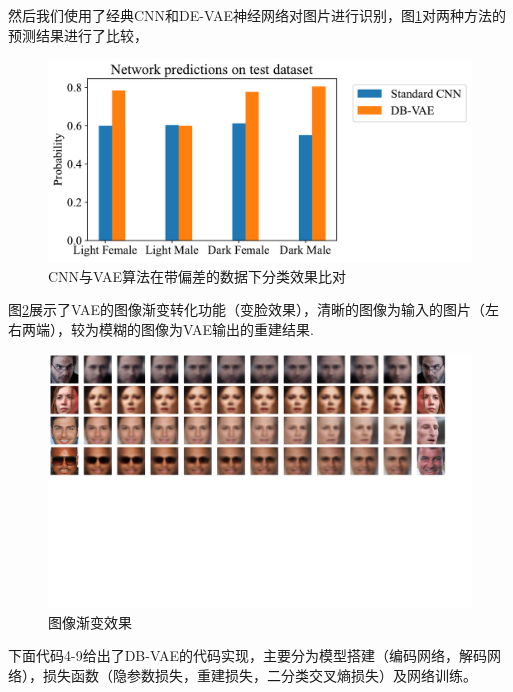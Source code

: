 \documentclass[12pt, a4paper, oneside]{ctexart}
\begin{document}
然后我们使用了经典CNN和DE-VAE神经网络对图片进行识别，图\ref{fig-compare-cnn-vae}对两种方法的预测结果进行了比较，

\begin{figure}[h]
  \centering
  \includegraphics[scale=0.7]{./code/figures/DB-VAE/compare_cnn_vae.pdf}
  \caption{CNN与VAE算法在带偏差的数据下分类效果比对}
  \label{fig-compare-cnn-vae}
\end{figure}

图\ref{fig-face-gradient}展示了VAE的图像渐变转化功能（变脸效果），清晰的图像为输入的图片（左右两端），较为模糊的图像为VAE输出的重建结果.
\begin{figure}[h]
  \hspace{-2.2cm}
  \includegraphics[scale=0.171]{./code/figures/DB-VAE/face_gradient.drawio.pdf}
  \caption{图像渐变效果}
  \label{fig-face-gradient}
\end{figure}

下面代码4-9给出了DB-VAE的代码实现，主要分为模型搭建（编码网络，解码网络），损失函数（隐参数损失，重建损失，二分类交叉熵损失）及网络训练。
\end{document}
